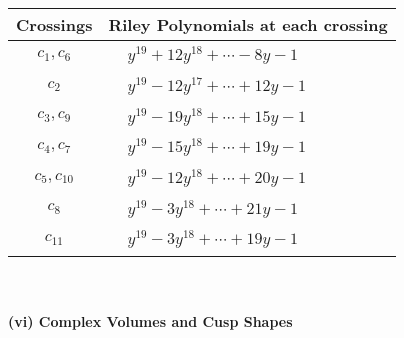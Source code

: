 \documentclass[1p]{elsarticle_modified}
\theoremstyle{definition}
\begin{document}
\begin{tabular}{m{50pt}|m{274pt}}
Crossings & \hspace{64pt}Riley Polynomials at each crossing \\
\hline $$\begin{aligned}c_{1},c_{6}\end{aligned}$$&$\begin{aligned}
&y^{19}+12 y^{18}+\cdots-8 y-1
\end{aligned}$\\
\hline $$\begin{aligned}c_{2}\end{aligned}$$&$\begin{aligned}
&y^{19}-12 y^{17}+\cdots+12 y-1
\end{aligned}$\\
\hline $$\begin{aligned}c_{3},c_{9}\end{aligned}$$&$\begin{aligned}
&y^{19}-19 y^{18}+\cdots+15 y-1
\end{aligned}$\\
\hline $$\begin{aligned}c_{4},c_{7}\end{aligned}$$&$\begin{aligned}
&y^{19}-15 y^{18}+\cdots+19 y-1
\end{aligned}$\\
\hline $$\begin{aligned}c_{5},c_{10}\end{aligned}$$&$\begin{aligned}
&y^{19}-12 y^{18}+\cdots+20 y-1
\end{aligned}$\\
\hline $$\begin{aligned}c_{8}\end{aligned}$$&$\begin{aligned}
&y^{19}-3 y^{18}+\cdots+21 y-1
\end{aligned}$\\
\hline $$\begin{aligned}c_{11}\end{aligned}$$&$\begin{aligned}
&y^{19}-3 y^{18}+\cdots+19 y-1
\end{aligned}$\\
\hline
\end{tabular}\\~\\
\newpage\flushleft \textbf{(vi) Complex Volumes and Cusp Shapes}
\end{document}
